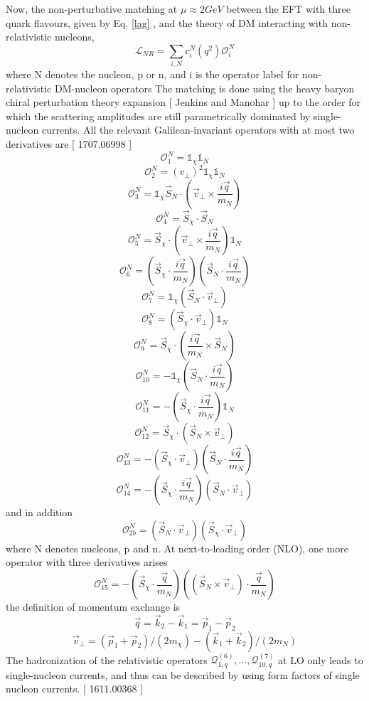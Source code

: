 \documentclass[12pt]{article}
\begin{document}
Now, the non-perturbative matching at $\mu \approx 2 GeV$ between the EFT with three quark flavours, given by Eq. \ref{lag} , and the theory of DM interacting with non-relativistic nucleons, 
\begin{equation}\label{lag2}
\mathcal L_{NR} = \sum_{i,N} c_i^N (q^2) \mathcal O_i^N
\end{equation}
where N denotes the nucleon, p or n, and i is the operator label for non-relativistic DM-nucleon operators
The matching is done using the heavy baryon chiral perturbation theory expansion [ Jenkins and Manohar ] up to the order for which the scattering amplitudes are still parametrically dominated by single-nucleon currents. 
All the relevant Galilean-invariant operators with at most two derivatives are [ 1707.06998 ]
$$
\mathcal O_1^N = \mathbb 1_\chi \mathbb 1_N
$$
$$
\mathcal O_2^N = (v_\bot )^2 \mathbb 1_\chi \mathbb 1_N
$$
$$
\mathcal O_3^N = \mathbb 1_\chi \vec S_N \cdot ( \vec v_\bot \times \frac{i \vec q}{m_N} ) 
$$
$$
\mathcal O_4^N =  \vec S_\chi \cdot  \vec S_N
$$
$$
\mathcal O_5^N = \vec S_\chi \cdot ( \vec v_\bot \times \frac{i \vec q}{m_N} )  \mathbb 1_N
$$
$$
\mathcal O_6^N = (\vec S_\chi \cdot   \frac{i \vec q}{m_N} )(   \vec S_N \cdot   \frac{i \vec q}{m_N} )
$$
$$
\mathcal O_7^N = \mathbb 1_\chi(   \vec S_N \cdot   \vec v_\bot )
$$
$$
\mathcal O_8^N = (   \vec S_\chi \cdot   \vec v_\bot )\mathbb 1_N
$$
$$
\mathcal O_9^N =    \vec S_\chi \cdot  ( \frac{i \vec q}{m_N} \times \vec S_N )
$$
$$
\mathcal O_{10}^N =   - \mathbb 1_\chi  (  \vec S_N  \cdot \frac{i \vec q}{m_N})
$$
$$
\mathcal O_{11}^N =   - (  \vec S_\chi  \cdot \frac{i \vec q}{m_N}) \mathbb 1_N
$$
$$
\mathcal O_{12}^N =  \vec S_\chi  \cdot (  \vec S_N  \times \vec v_\bot)
$$
$$
\mathcal O_{13}^N =   -  (  \vec S_\chi  \cdot \vec v_\bot  )  (  \vec S_N  \cdot \frac{i \vec q}{m_N} )
$$
$$
\mathcal O_{14}^N =   -  (  \vec S_\chi  \cdot \frac{i \vec q}{m_N} )  (  \vec S_N  \cdot \vec v_\bot )
$$
and in addition
$$
\mathcal O_{2b}^N = (\vec S_N \cdot \vec v_\bot ) ( \vec S_\chi \cdot \vec v_\bot)
$$
where N denotes nucleons, p and n. At next-to-leading order (NLO), one more operator with three derivatives arises
$$
\mathcal O_{15}^N = - ( \vec S_\chi \cdot \frac{\vec q } {m_N } ) (( \vec S_N \times \vec v_\bot ) \cdot \frac{\vec q }{m_N} )
$$
the definition of momentum exchange is 
$$
\vec q = \vec k_2 - \vec k_1 = \vec p_1 - \vec p_2
$$
$$
\vec v_\bot = (\vec p_1 + \vec p_2 ) / (2 m_\chi) -  (\vec k_1 + \vec k_2 ) / (2 m_N )  
$$
The hadronization of the relativistic operators $\mathcal Q_{1,q}^{(6) }, ... , \mathcal Q_{10,q}^{(7)}$ at LO only leads to single-nucleon currents, and thus can be described by using form factors of single nucleon currents. [ 1611.00368 ] 
\end{document}
